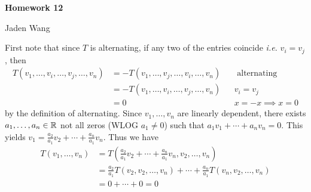 \documentclass[12pt]{article}
\begin{document}
\centerline {\textsf{\textbf{\LARGE{Homework 12}}}}
\centerline {Jaden Wang}
\vspace{.15in}
\begin{problem}[4.2.1]
First note that since $ T$ is alternating,  if any two of the entries coincide \emph{i.e.} $ v_i = v_j$, then
\begin{align*}
	T(v_1,\ldots,v_i,\ldots,v_j,\ldots,v_n) &= - T(v_1,\ldots,v_j,\ldots,v_i,\ldots,v_n) && \text{ alternating} \\
						&= -T(v_1,\ldots,v_i,\ldots,v_j,\ldots,v_n) && v_i = v_j\\
						&= 0 &&  x=-x \implies x=0
\end{align*}
by the definition of alternating. Since $ v_1,\ldots,v_n$ are linearly dependent, there exists $ a_1,\ldots,a_n \in \mathbb{R}$ not all zeros (WLOG $ a_1 \neq 0$) such that $ a_1 v_1 + \cdots + a_n v_n = 0$. This yields $ v_1 = \frac{a_2}{ a_1} v_2 + \cdots + \frac{a_n}{ a_1}v_n$. Thus we have
\begin{align*}
	T(v_1,\ldots,v_n) &= T\left(\frac{a_2}{ a_1} v_2 + \cdots + \frac{a_n}{ a_1} v_n, v_2,\ldots,v_n\right) \\
	&=\frac{a_2}{ a_1}T\left(v_2,v_2,\ldots,v_n \right) + \cdots + \frac{a_n}{ a_1}T\left( v_n,v_2,\ldots,v_n \right)   \\
	&= 0+ \cdots + 0 = 0 
\end{align*}
\end{problem}
\end{document}
